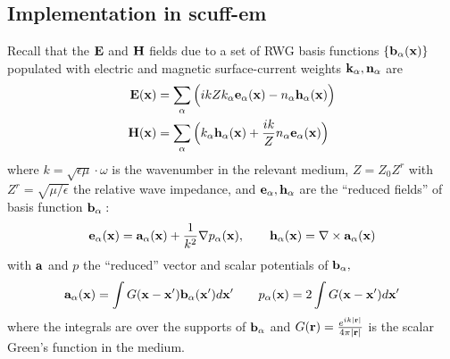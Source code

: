 \subsection*{Implementation in {\sc scuff-em}}

Recall that the $\mathbf{E}$ and $\mathbf{H}$ fields due to a set of
RWG basis functions $\{\mathbf{b}_\alpha(\mathbf{x})\}$ populated
with electric and magnetic surface-current weights 
$\mathbf{k}_\alpha, \mathbf{n}_\alpha$ are 
\begin{align*}
\mathbf{E}(\mathbf{x}) 
 &= \sum_{\alpha} \Big( ikZ k_\alpha \mathbf{e}_\alpha(\mathbf{x})
                        -n_\alpha \mathbf{h}_\alpha(\mathbf{x})
                  \Big)
\\
\mathbf{H}(\mathbf{x}) 
 &= \sum_{\alpha} \Big( k_\alpha \mathbf{h}_\alpha(\mathbf{x})
                        +\frac{ik}{Z} n_\alpha \mathbf{e}_\alpha(\mathbf{x})
                  \Big)
\end{align*}
where $k=\sqrt{\epsilon \mu}\cdot \omega$ is the wavenumber in the relevant
medium, $Z=Z_0Z^r$ with $Z^r=\sqrt{\mu/\epsilon}$ the relative wave impedance,
and $\mathbf{e}_\alpha, \mathbf{h}_\alpha$ are the ``reduced fields'' of basis
function $\mathbf{b}_\alpha:$
$$
 \mathbf{e}_\alpha(\mathbf{x}) = \mathbf{a}_\alpha(\mathbf{x}) + \frac{1}{k^2}\nabla p_\alpha(\mathbf{x}),
 \qquad
 \mathbf{h}_\alpha(\mathbf{x}) = \nabla \times \mathbf{a}_\alpha(\mathbf{x})
$$
with $\mathbf{a}$ and $p$ the ``reduced'' vector and scalar potentials
of $\mathbf{b}_\alpha,$
$$
 \mathbf{a}_\alpha(\mathbf{x}) 
 = 
 \int G(\mathbf{x}-\mathbf{x}^\prime) \mathbf{b}_\alpha(\mathbf{x}^\prime) d\mathbf{x}^\prime 
\qquad
 p_\alpha(\mathbf{x}) 
 = 2\int G(\mathbf{x}-\mathbf{x}^\prime) d\mathbf{x}^\prime 
$$
where the integrals are over the supports of $\mathbf{b}_\alpha$
and $G(\mathbf{r})=\frac{e^{ik|\mathbf{r}|}}{4\pi|\mathbf{r}|}$ is the 
scalar Green's function in the medium.

